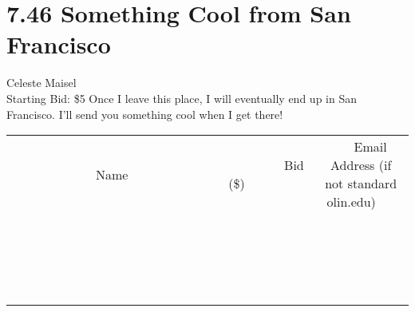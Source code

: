 \documentclass[11pt]{article}
\begin{document}
\section*{7.46 Something Cool from San Francisco}
Celeste Maisel
\\
Starting Bid: \$5
\newline
Once I leave this place, I will eventually end up in San Francisco. I'll send you something cool when I get there!
\\[3ex]
\begin{tabular}{c c c}
~~~~~~~~~~~~~Name~~~~~~~~~~~~~ & ~~~~~~~~~Bid (\$)~~~~~~~~~  & ~~~Email Address (if not standard olin.edu)~~~\\
 & & \\
\hline
 & & \\
\hline
 & & \\
\hline
 & & \\
\hline
 & & \\
\hline
 & & \\
\hline
 & & \\
\hline
 & & \\
\hline
 & & \\
\hline
 & & \\
\hline
 & & \\
\hline
 & & \\
\hline
 & & \\
\hline
 & & \\
\hline
 & & \\
\hline
 & & \\
\hline
 & & \\
\hline
 & & \\
\hline
 & & \\
\hline
\end{tabular}
\newpage
\end{document}
